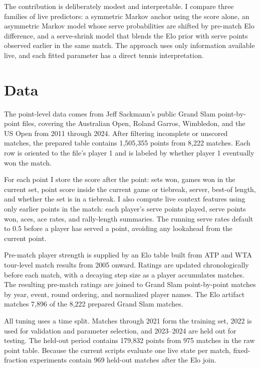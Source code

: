 \documentclass{article} %
\begin{document}
The contribution is deliberately modest and interpretable. I compare three
families of live predictors: a symmetric Markov anchor using the score alone, an
asymmetric Markov model whose serve probabilities are shifted by pre-match Elo
difference, and a serve-shrink model that blends the Elo prior with serve points
observed earlier in the same match. The approach uses only information available
live, and each fitted parameter has a direct tennis interpretation.

\section{Data}

The point-level data comes from Jeff Sackmann's public Grand Slam
point-by-point files, covering the Australian Open, Roland Garros, Wimbledon,
and the US Open from 2011 through 2024. After filtering incomplete or unscored
matches, the prepared table contains 1,505,355 points from 8,222 matches. Each
row is oriented to the file's player 1 and is labeled by whether player 1
eventually won the match.

For each point I store the score after the point: sets won, games won in the
current set, point score inside the current game or tiebreak, server, best-of
length, and whether the set is in a tiebreak. I also compute live context
features using only earlier points in the match: each player's serve points
played, serve points won, aces, ace rates, and rally-length summaries. The
running serve rates default to 0.5 before a player has served a point, avoiding
any lookahead from the current point.

Pre-match player strength is supplied by an Elo table built from ATP and WTA
tour-level match results from 2005 onward. Ratings are updated chronologically
before each match, with a decaying step size as a player accumulates matches.
The resulting pre-match ratings are joined to Grand Slam point-by-point matches
by year, event, round ordering, and normalized player names. The Elo artifact
matches 7,896 of the 8,222 prepared Grand Slam matches.

All tuning uses a time split. Matches through 2021 form the training set, 2022
is used for validation and parameter selection, and 2023--2024 are held out for
testing. The held-out period contains 179,832 points from 975 matches in the
raw point table. Because the current scripts evaluate one live state per match,
fixed-fraction experiments contain 969 held-out matches after the Elo join.
\end{document}
